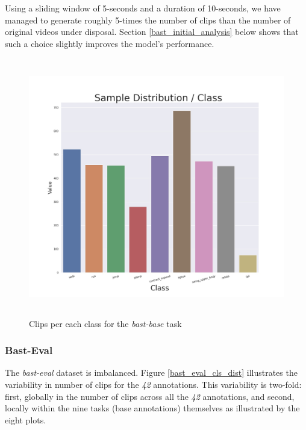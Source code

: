 \documentclass[extern,palatino]{cgMA}
\begin{document}
Using a sliding window of 5-seconds and a duration of 10-seconds, we have managed to generate roughly 5-times the number of clips than the number of original videos under disposal. Section \ref{bast_initial_analysis} below shows that such a choice slightly improves the model's performance.

\begin{figure}[h]
\includegraphics[height={320pt}, width={380pt}]{Thesis/images/bast_base_cls_dist.jpg}
\caption{Clips per each class for the \textit{bast-base} task}
\label{bast_base_cls_dist}
\end{figure}

\subsubsection{Bast-Eval}
\label{initial_analysis_bast_eval}
The \textit{bast-eval} dataset is imbalanced. Figure \ref{bast_eval_cls_dist} illustrates the variability in number of clips for the \textit{42} annotations. This variability is two-fold: first, globally in the number of clips across all the \textit{42} annotations, and second, locally within the nine tasks (base annotations) themselves as illustrated by the eight plots.
\end{document}
